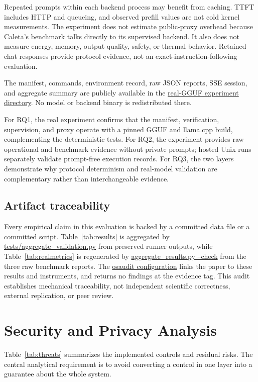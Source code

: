 \documentclass[11pt,a4paper]{article}
\newcommand{\artifact}[2]{\href{https://github.com/BiVelio/caleta/blob/evidence-v1.1/#1}{#2}}
\begin{document}
Repeated prompts within each backend process may benefit from caching. TTFT includes HTTP and queueing, and observed prefill values are not cold kernel measurements. The experiment does not estimate public-proxy overhead because Caleta's benchmark talks directly to its supervised backend. It also does not measure energy, memory, output quality, safety, or thermal behavior. Retained chat responses provide protocol evidence, not an exact-instruction-following evaluation.

The manifest, commands, environment record, raw JSON reports, SSE session, and aggregate summary are publicly available in the \artifact{experiments/real-gguf-qwen2.5-0.5b/README.md}{real-GGUF experiment directory}. No model or backend binary is redistributed there.

For RQ1, the real experiment confirms that the manifest, verification, supervision, and proxy operate with a pinned GGUF and llama.cpp build, complementing the deterministic tests. For RQ2, the experiment provides raw operational and benchmark evidence without private prompts; hosted Unix runs separately validate prompt-free execution records. For RQ3, the two layers demonstrate why protocol determinism and real-model validation are complementary rather than interchangeable evidence.

\subsection{Artifact traceability}

Every empirical claim in this evaluation is backed by a committed data file or a committed script. Table~\ref{tab:results} is aggregated by \artifact{tests/aggregate_validation.py}{tests/aggregate\_validation.py} from preserved runner outputs, while Table~\ref{tab:realmetrics} is regenerated by \artifact{experiments/real-gguf-qwen2.5-0.5b/scripts/aggregate_results.py}{aggregate\_results.py --check} from the three raw benchmark reports. The \artifact{osaudit.toml}{osaudit configuration} links the paper to these results and instruments, and returns no findings at the evidence tag. This audit establishes mechanical traceability, not independent scientific correctness, external replication, or peer review.

\section{Security and Privacy Analysis}

Table~\ref{tab:threats} summarizes the implemented controls and residual risks. The central analytical requirement is to avoid converting a control in one layer into a guarantee about the whole system.
\end{document}
